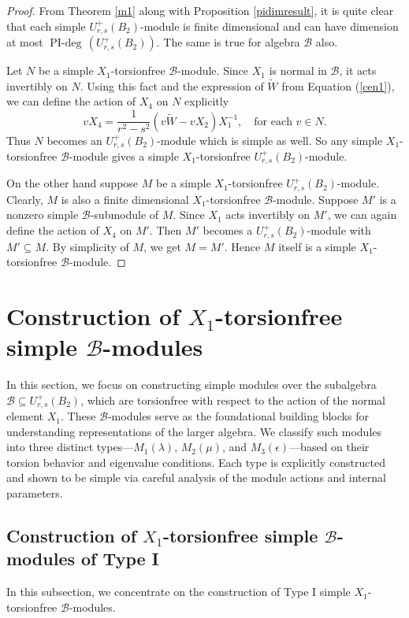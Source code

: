 \documentclass[12 pt,reqno]{amsart}
\numberwithin{equation}{section}
\DeclareMathOperator{\pideg}{PI-deg}
\theoremstyle{definition}
\theoremstyle{definition}
\theoremstyle{remark}
\theoremstyle{remark}
\begin{document}
\begin{proof}
   From Theorem \ref{m1} along with Proposition \ref{pidimresult}, it is quite clear that each simple $U_{r,s}^{+}(B_2)$-module is finite dimensional and can have dimension at most $\pideg\,\left(U_{r,s}^{+}(B_2)\right)$. The same is true for algebra $\mathcal{B}$ also.

 \noindent Let $N$ be a simple $X_1$-torsionfree $\mathcal{B}$-module. Since $X_1$ is normal in $\mathcal{B}$, it acts invertibly on $N$. Using this fact and the expression of $\tilde{W}$  from Equation (\ref{cen1}), we can define the action of $X_4$ on $N$ explicitly 
\[vX_4=\displaystyle\frac{1}{r^2-s^2}\left(v\tilde{W}-vX_2\right)X_1^{-1}, \quad \text{for each $v\in N$}.\]
Thus $N$ becomes an $U_{r,s}^{+}(B_2)$-module which is simple as well. So any simple $X_1$-torsionfree $\mathcal{B}$-module gives a simple $X_1$-torsionfree $U_{r,s}^{+}(B_2)$-module.

 \noindent On the other hand suppose $M$ be a simple $X_1$-torsionfree $U_{r,s}^{+}(B_2)$-module. Clearly, $M$ is also a finite dimensional $X_1$-torsionfree $\mathcal{B}$-module. Suppose $M'$ is a nonzero simple $\mathcal{B}$-submodule of $M$. Since $X_1$ acts invertibly on $M'$, we can again define the action of $X_4$ on $M'$. Then $M'$ becomes a $U_{r,s}^{+}(B_2)$-module with $M'\subseteq M$. By simplicity of $M$, we get $M=M'$. Hence $M$ itself is a simple $X_1$-torsionfree $\mathcal{B}$-module.  
\end{proof}
 \section{\texorpdfstring{Construction of $X_1$-torsionfree simple $\mathcal{B}$-modules}{}}\label{Sec5}

In this section, we focus on constructing simple modules over the subalgebra $ \mathcal{B} \subseteq U^+_{r,s}(B_2) $, which are torsionfree with respect to the action of the normal element $ X_1 $. These $ \mathcal{B} $-modules serve as the foundational building blocks for understanding representations of the larger algebra. We classify such modules into three distinct types—$ M_1(\lambda) $, $ M_2(\mu) $, and $ M_3(\epsilon) $—based on their torsion behavior and eigenvalue conditions. Each type is explicitly constructed and shown to be simple via careful analysis of the module actions and internal parameters.


 
 \subsection{\texorpdfstring{ Construction of $X_1$-torsionfree simple $\mathcal{B}$-modules of Type I}{}} In this subsection, we concentrate on the construction of Type I simple $X_1$-torsionfree $\mathcal{B}$-modules.
 
\end{document}
